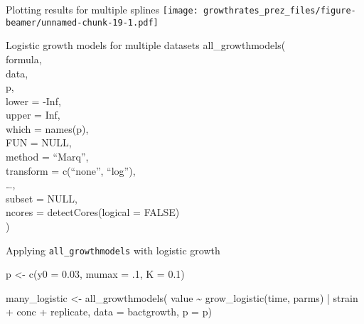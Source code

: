 \documentclass[
  ignorenonframetext,
]{beamer}
\newenvironment{Shaded}{\begin{snugshade}}{\end{snugshade}}
\newcommand{\AttributeTok}[1]{\textcolor[rgb]{0.77,0.63,0.00}{#1}}
\newcommand{\DecValTok}[1]{\textcolor[rgb]{0.00,0.00,0.81}{#1}}
\newcommand{\FloatTok}[1]{\textcolor[rgb]{0.00,0.00,0.81}{#1}}
\newcommand{\FunctionTok}[1]{\textcolor[rgb]{0.00,0.00,0.00}{#1}}
\newcommand{\NormalTok}[1]{#1}
\newcommand{\OtherTok}[1]{\textcolor[rgb]{0.56,0.35,0.01}{#1}}
\newcommand{\SpecialCharTok}[1]{\textcolor[rgb]{0.00,0.00,0.00}{#1}}
\begin{document}
\begin{frame}{Plotting results for multiple splines}
\protect\hypertarget{plotting-results-for-multiple-splines}{}
\texttt{[image: growthrates\_prez\_files/figure-beamer/unnamed-chunk-19-1.pdf]}
\end{frame}

\begin{frame}{Logistic growth models for multiple datasets}
\protect\hypertarget{logistic-growth-models-for-multiple-datasets}{}
all\_growthmodels(\\
formula,\\
data,\\
p,\\
lower = -Inf,\\
upper = Inf,\\
which = names(p),\\
FUN = NULL,\\
method = ``Marq'',\\
transform = c(``none'', ``log''),\\
\ldots,\\
subset = NULL,\\
ncores = detectCores(logical = FALSE)\\
)
\end{frame}

\begin{frame}[fragile]{Applying \texttt{all\_growthmodels} with logistic
growth}
\protect\hypertarget{applying-all_growthmodels-with-logistic-growth}{}
\begin{Shaded}
\begin{Highlighting}[]
\NormalTok{p   }\OtherTok{\textless{}{-}} \FunctionTok{c}\NormalTok{(}\AttributeTok{y0 =} \FloatTok{0.03}\NormalTok{, }\AttributeTok{mumax =}\NormalTok{ .}\DecValTok{1}\NormalTok{, }\AttributeTok{K =} \FloatTok{0.1}\NormalTok{)}

\NormalTok{many\_logistic }\OtherTok{\textless{}{-}} \FunctionTok{all\_growthmodels}\NormalTok{(}
\NormalTok{                   value }\SpecialCharTok{\textasciitilde{}} \FunctionTok{grow\_logistic}\NormalTok{(time, parms) }\SpecialCharTok{|} 
\NormalTok{                     strain }\SpecialCharTok{+}\NormalTok{ conc }\SpecialCharTok{+}\NormalTok{ replicate,}
                   \AttributeTok{data =}\NormalTok{ bactgrowth,}
                   \AttributeTok{p =}\NormalTok{ p)}
\end{Highlighting}
\end{Shaded}
\end{frame}
\end{document}
